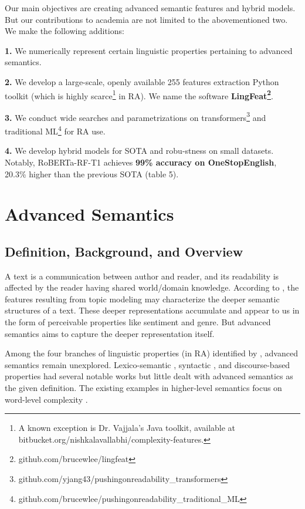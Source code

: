 \documentclass[11pt]{article}
\begin{document}
Our main objectives are creating advanced semantic features and hybrid models. But our contributions to academia are not limited to the abovementioned two. We make the following additions:

\noindent
\textbf{1.} We numerically represent certain linguistic properties pertaining to advanced semantics.

\noindent
\textbf{2.} We develop a large-scale, openly available 255 features extraction Python toolkit (which is highly scarce\footnote{A known exception is Dr. Vajjala's Java toolkit, available at bitbucket.org/nishkalavallabhi/complexity-features.} in RA). We name the software \textbf{LingFeat\footnote{github.com/brucewlee/lingfeat}}.

\noindent
\textbf{3.} We conduct wide searches and parametrizations on transformers\footnote{github.com/yjang43/pushingonreadability\_transformers} and traditional ML\footnote{github.com/brucewlee/pushingonreadability\_traditional\_ML} for RA use.

\noindent
\textbf{4.} We develop hybrid models for SOTA and robu-stness on small datasets. Notably, RoBERTa-RF-T1 achieves \textbf{99\% accuracy on OneStopEnglish}, 20.3\% higher than the previous SOTA (table 5).

\section{Advanced Semantics}
\subsection{Definition, Background, and Overview}
A text is a communication between author and reader, and its readability is affected by the reader having shared world/domain knowledge. According to \citet{Collins-Thompson:14}, the features resulting from topic modeling may characterize the deeper semantic structures of a text. These deeper representations accumulate and appear to us in the form of perceivable properties like sentiment and genre. But advanced semantics aims to capture the deeper representation itself.

Among the four branches of linguistic properties (in RA) identified by \citet{Collins-Thompson:14}, advanced semantics remain unexplored. Lexico-semantic \citep{Lu:11,Malvern:12}, syntactic \citep{heilman-etal-2007-combining,Petersen:09}, and discourse-based \citep{Mcnamara:10} properties had several notable works but little dealt with advanced semantics as the given definition. The existing examples in higher-level semantics focus on word-level complexity \citep{collins2004language, crossley2008assessing, landauer2011word, nam2017predicting}.
\end{document}
